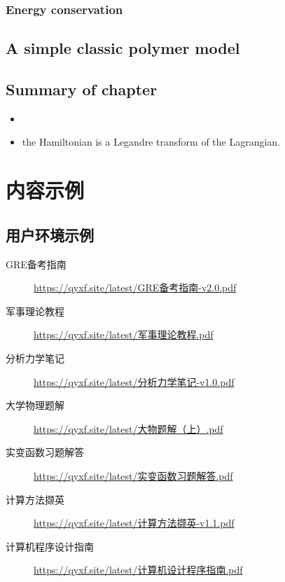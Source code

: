 \documentclass[
  10pt,
  twoside,
  openany,
  b5paper, %
  colorscheme = bootstrap-v4, %
]{qyxf-book}
\begin{document}
\subsection{Energy conservation}




\section{A simple classic polymer model}





\section{Summary of chapter}

\begin{itemize}
	\item 
	\item the Hamiltonian is a Legandre transform of the Lagrangian.
\end{itemize}








\chapter{内容示例}
\section{用户环境示例}

\begin{tcolorbox}
	\begin{description}
		\item [GRE备考指南] \url{https://qyxf.site/latest/GRE备考指南-v2.0.pdf}
		\item [军事理论教程] \url{https://qyxf.site/latest/军事理论教程.pdf}
		\item [分析力学笔记] \url{https://qyxf.site/latest/分析力学笔记-v1.0.pdf}
		\item [大学物理题解] \url{https://qyxf.site/latest/大物题解（上）.pdf}
		\item [实变函数习题解答] \url{https://qyxf.site/latest/实变函数习题解答.pdf}
		\item [计算方法撷英] \url{https://qyxf.site/latest/计算方法撷英-v1.1.pdf}
		\item [计算机程序设计指南] \url{https://qyxf.site/latest/计算机设计程序指南.pdf}
	\end{description}
\end{tcolorbox}
\end{document}
